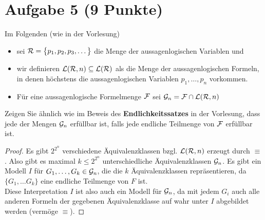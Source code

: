 \section*{Aufgabe 5 (9 Punkte)}
Im Folgenden (wie in der Vorlesung)
\begin{itemize}
	\item sei $\mathcal{R}=\big\lbrace p_1,p_2,p_3,\ldots\big\rbrace$ die Menge der aussagenlogischen Variablen und
	\item wir definieren $\mathcal{L}(\mathcal{R},n)\subseteq\mathcal{L}(\mathcal{R})$ als die Menge der aussagenlogischen Formeln, in denen höchstens die aussagenlogischen Variablen $p_1,\ldots,p_n$ vorkommen.
	\item Für eine aussagenlogische Formelmenge $\mathcal{F}$ sei $\mathcal{G}_n=\mathcal{F}\cap\mathcal{L}(\mathcal{R},n)$
\end{itemize}
Zeigen Sie ähnlich wie im Beweis des \textbf{Endlichkeitssatzes} in der Vorlesung, dass jede der Mengen $\mathcal{G}_n$ erfüllbar ist, falls jede endliche Teilmenge von $\mathcal{F}$ erfüllbar ist.

\begin{proof}
	Es gibt $2^{2^n}$ verschiedene Äquivalenzklassen bzgl. $\mathcal{L}(\mathcal{R},n)$ erzeugt durch $\equiv$. 
	Also gibt es maximal $k\leq2^{2^n}$ unterschiedliche Äquivalenzklassen $\mathcal{G}_n$.
	Es gibt ein Modell $I$ für $G_1,\ldots,G_k\in\mathcal{G}_n$, die die $k$ Äquivalenzklassen repräsentieren, da $\lbrace G_1,\ldots G_k\rbrace$ eine endliche Teilmenge von $F$ ist.\\
	Diese Interpretation $I$ ist also auch ein Modell für $\mathcal{G}_n$, da mit jedem $G_i$ auch alle anderen Formeln der gegebenen Äquivalenzklasse auf wahr unter $I$ abgebildet werden (vermöge $\equiv$).
\end{proof}
